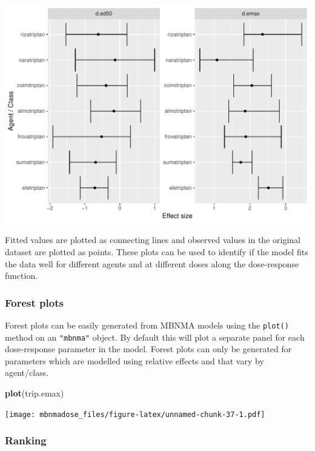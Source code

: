 \documentclass[]{article}
\newenvironment{Shaded}{\begin{snugshade}}{\end{snugshade}}
\newcommand{\KeywordTok}[1]{\textcolor[rgb]{0.13,0.29,0.53}{\textbf{#1}}}
\newcommand{\NormalTok}[1]{#1}
\begin{document}
\includegraphics{mbnmadose_files/figure-latex/unnamed-chunk-36-1.pdf}

Fitted values are plotted as connecting lines and observed values in the
original dataset are plotted as points. These plots can be used to
identify if the model fits the data well for different agents and at
different doses along the dose-response function.

\hypertarget{forest-plots}{%
\subsubsection{Forest plots}\label{forest-plots}}

Forest plots can be easily generated from MBNMA models using the
\texttt{plot()} method on an \texttt{"mbnma"} object. By default this
will plot a separate panel for each dose-response parameter in the
model. Forest plots can only be generated for parameters which are
modelled using relative effects and that vary by agent/class.

\begin{Shaded}
\begin{Highlighting}[]
\KeywordTok{plot}\NormalTok{(trip.emax)}
\end{Highlighting}
\end{Shaded}

\texttt{[image: mbnmadose\_files/figure-latex/unnamed-chunk-37-1.pdf]}

\hypertarget{ranking}{%
\subsubsection{Ranking}\label{ranking}}
\end{document}
